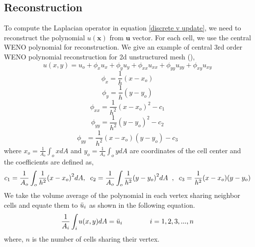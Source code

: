 \documentclass[12pt]{article}
\begin{document}
\subsection*{Reconstruction}
To compute the Laplacian operator in equation \ref{discrete v update}, we need to reconstruct the polynomial ${u}(\mathbf{x})$ from $\mathbf{u}$ vector. For each cell, we use the central WENO polynomial for reconstruction. We give an example of central 3rd order WENO polynomial reconstruction for 2d unstructured mesh (\cite{BALSARA}),
\begin{equation}\label{polynomial}
    u(x,y) = u_{o} + \phi_{x}u_{x} + \phi_{y}u_{y} + \phi_{xx}u_{xx} + \phi_{yy}u_{yy} + \phi_{xy}u_{xy}
\end{equation}
\begin{equation*}
    \phi_{x} = \frac{1}{h}(x - x_{o})
\end{equation*}
\begin{equation*}
    \phi_{y} = \frac{1}{h}(y - y_{o})
\end{equation*}
\begin{equation*}
    \phi_{xx} = \frac{1}{h^2}{(x - x_{o})}^2 - c_{1}
\end{equation*}
\begin{equation*}
    \phi_{yy} = \frac{1}{h^2}{(y - y_{o})}^2  - c_{2}
\end{equation*}
\begin{equation*}
    \phi_{yy} = \frac{1}{h^2}{(x - x_{o})}{(y - y_{o})}  - c_{3}
\end{equation*}
where $x_{o} = \frac{1}{A_{o}}\int_{o} x dA$ and $y_{o} = \frac{1}{A_{o}}\int_{o} y dA$ are coordinates of the cell center and the coefficients are defined as,
\begin{equation*}
c_{1} = \frac{1}{A_{o}}\int_{o} \frac{1}{h^2}{(x - x_{o})}^2  dA,\hspace{0.2cm} c_{2} = \frac{1}{A_{o}}\int_{o} \frac{1}{h^2}{(y - y_{o})}^2 dA \hspace{0.2cm}, \hspace{0.2cm}c_{3} = \frac{1}{h^2}(x - x_{o})(y - y_{o})
\end{equation*}
We take the volume average of the polynomial in each vertex sharing neighbor cells and equate them to $\Bar{u}_{i}$ as shown in the following equation.  
\begin{equation}
    \frac{1}{A_{i}}\int_{i}u(x,y)dA = \Bar{u}_{i} \hspace{1.4cm} i=1,2,3,...,n
\end{equation}
where, $n$ is the number of cells sharing their vertex.
\end{document}
